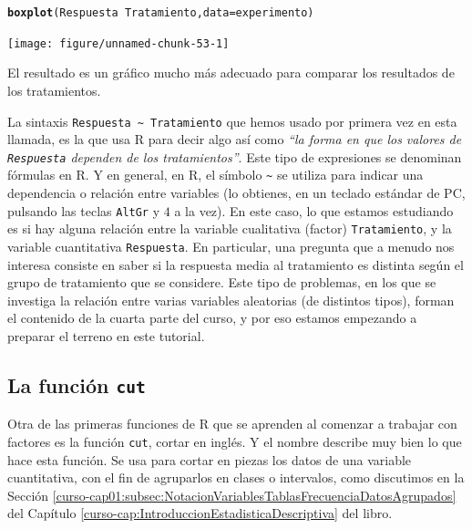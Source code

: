 \documentclass[10pt,a4paper]{article}\usepackage[]{graphicx}\usepackage[]{color}
\makeatletter
\newcommand{\hlopt}[1]{\textcolor[rgb]{0,0,0}{#1}}%
\newcommand{\hlstd}[1]{\textcolor[rgb]{0.345,0.345,0.345}{#1}}%
\newcommand{\hlkwc}[1]{\textcolor[rgb]{0.333,0.667,0.333}{#1}}%
\newcommand{\hlkwd}[1]{\textcolor[rgb]{0.737,0.353,0.396}{\textbf{#1}}}%
\newenvironment{kframe}{%
 \def\at@end@of@kframe{}%
 \ifinner\ifhmode%
  \def\at@end@of@kframe{\end{minipage}}%
  \begin{minipage}{\columnwidth}%
 \fi\fi%
 \def\FrameCommand##1{\hskip\@totalleftmargin \hskip-\fboxsep
 \colorbox{shadecolor}{##1}\hskip-\fboxsep
     \hskip-\linewidth \hskip-\@totalleftmargin \hskip\columnwidth}%
 \MakeFramed {\advance\hsize-\width
   \@totalleftmargin\z@ \linewidth\hsize
   \@setminipage}}%
 {\par\unskip\endMakeFramed%
 \at@end@of@kframe}
\newenvironment{knitrout}{}{} %
\newcounter {cont01}
\makeatother
\begin{document}
\begin{knitrout}
\color{fgcolor}\begin{kframe}
\begin{alltt}
\hlkwd{boxplot}\hlstd{(Respuesta} \hlopt{~} \hlstd{Tratamiento,} \hlkwc{data} \hlstd{= experimento)}
\end{alltt}
\end{kframe}
\texttt{[image: figure/unnamed-chunk-53-1]} 

\end{knitrout}

El resultado es un gráfico mucho más adecuado para comparar los resultados de los tratamientos.

La sintaxis \verb#Respuesta ~ Tratamiento# que hemos usado por primera vez en esta llamada, es la que usa R para decir algo así como {\em ``la forma en que los valores de {\tt Respuesta} dependen de los tratamientos''}. Este tipo de expresiones se denominan {\sf fórmulas} en R. Y en general, en R, el símbolo \verb#~# se utiliza para indicar una dependencia o relación entre variables (lo obtienes, en un teclado estándar de PC, pulsando las teclas {\tt AltGr} y $4$ a la vez). En este caso, lo que estamos estudiando es si hay alguna relación entre la variable cualitativa (factor) {\tt Tratamiento}, y la variable cuantitativa {\tt Respuesta}. En particular, una pregunta que a menudo nos interesa consiste en saber si la respuesta media al tratamiento es distinta según el grupo de tratamiento que se considere.  Este tipo de problemas, en los que se investiga la relación entre varias variables aleatorias (de distintos tipos), forman el contenido de la cuarta parte del curso, y por eso estamos empezando a preparar el terreno en este tutorial.

\subsection{La función {\tt cut}}

Otra de las primeras funciones de R que se aprenden al comenzar a trabajar con factores es la función {\tt cut}, cortar en inglés. Y el nombre describe muy bien lo que hace esta función. Se usa para cortar en piezas los datos de  una variable cuantitativa, con el fin de agruparlos en clases o intervalos, como discutimos en la Sección \ref{curso-cap01:subsec:NotacionVariablesTablasFrecuenciaDatosAgrupados} del Capítulo \ref{curso-cap:IntroduccionEstadisticaDescriptiva} del libro.
\end{document}
